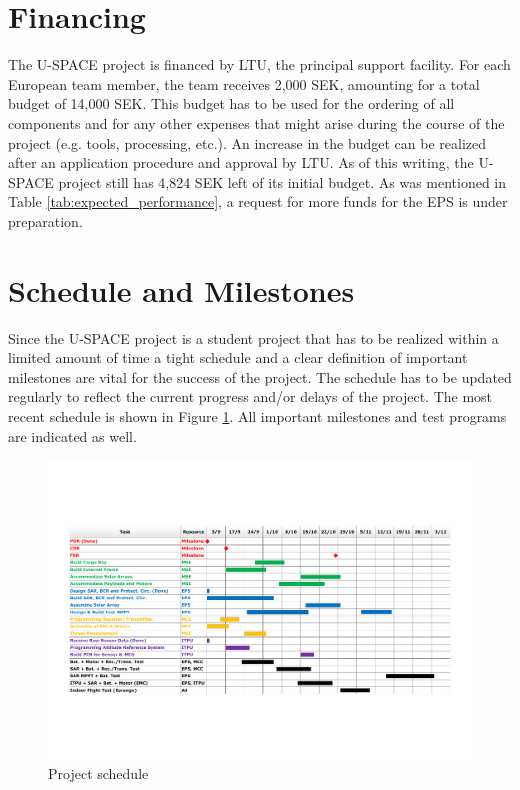 \section{Financing}
\label{sec:financing}
%
The \ac{U-SPACE} project is financed by \ac{LTU}, the principal support facility. For each European team member, the team receives 2,000 SEK, amounting for a total budget of 14,000 SEK. This budget has to be used for the ordering of all components and for any other expenses that might arise during the course of the project (e.g. tools, processing, etc.). An increase in the budget can be realized after an application procedure and approval by \ac{LTU}. As of this writing, the \ac{U-SPACE} project still has 4,824 SEK left of its initial budget. As was mentioned in Table \ref{tab:expected_performance}, a request for more funds for the \ac{EPS} is under preparation.
%
%
\section{Schedule and Milestones}
\label{sec:schedule}
%
Since the \ac{U-SPACE} project is a student project that has to be realized within a limited amount of time a tight schedule and a clear definition of important milestones are vital for the success of the project. The schedule has to be updated regularly to reflect the current progress and/or delays of the project. The most recent schedule is shown in Figure \ref{fig:project_plan}. All important milestones and test programs are indicated as well.
%
\begin{figure}
\centering
\includegraphics[width=\textwidth]{figures/fig_CDR_PM_GanttChart}
\caption{Project schedule}
\label{fig:project_plan}
\end{figure}
%
%
